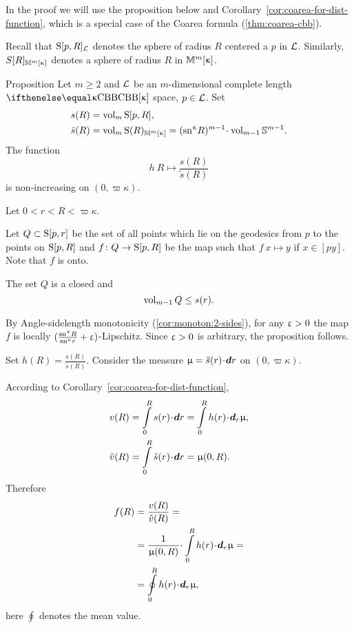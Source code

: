 In the proof we will use the proposition below and 
Corollary~\ref{cor:coarea-for-dist-function},
which is a special case of the Coarea formula (\ref{thm:coarea-cbb}).

Recall that $\mathrm{S}{}[p,R]_{\mathcal{L}}$ denotes the sphere of radius $R$ centered a $p$ in $\mathcal{L}$.
Similarly,  $S[R]_{\mathbb{M}_{{}}^{m}[{\upkappa}]}$ denotes  a sphere of radius $R$ in ${\mathbb{M}_{{}}^{m}[{\upkappa}]}$.

\begin{thm}{Proposition}\label{prop:monotonic-spheres}
Let $m\ge 2$ and 
$\mathcal{L}$ be an $m$-dimensional complete length $\Alex\kappa$ space, 
$p\in \spc{L}$.
Set
\begin{align*}
s(R)&=\vol_m\Sphere[p,R],
\\
\~s(R)&=\vol_m\Sphere(R)_{\Lob{m}{\kappa}}=(\sn\kappa R)^{m-1}\cdot\vol_{m-1}\SS^{m-1}.
\end{align*}
The function 
\[
h\: R\mapsto \frac {s(R)}{\tilde s(R)}
\]
is non-increasing on $(0,\varpi\kappa)$.
\end{thm}

Let $0<r<R<\varpi\kappa$.

Let $Q\subset \Sphere[p,r]$ be the set of all points 
which lie on the geodesics from $p$ to the points on $\mathrm{S}{}[p,R]$
and $f\:Q\to \Sphere[p,R]$ be the map such that $f\:x\mapsto y$ if $x\in [py]$.
Note that $f$ is onto.

The set $Q$ is a closed
and 
\[\vol_{m-1}Q\le s(r).\]

By Angle-sidelength  monotonicity (\ref{cor:monoton:2-sides}), 
for any $\upvarepsilon>0$ the map $f$ is 
locally $(\tfrac{\mathrm{sn}^{\upkappa} R}{\mathrm{sn}^{\upkappa} r}+\upvarepsilon)$-Lipschitz.
Since $\upvarepsilon>0$ is arbitrary, the proposition follows.
\qeds


Set $h(R)= \frac {s(R)}{\tilde s(R)}$.
Consider the measure $\mu=\tilde s(r)\cdot\d r$ on  $(0,\varpi\kappa)$.

According to Corollary~\ref{cor:coarea-for-dist-function},
\begin{align*}
v(R)&=\int\limits_0^R s(r)\cdot\d r=\int\limits_0^R h(r)\cdot\d_r \mu,
\\
\~v(R)&=\int\limits_0^R\tilde s(r)\cdot\d r=\mu(0,R).
\end{align*}
Therefore
\begin{align*}
f(R)&=\frac{v(R)}{\~v(R)}=
\\
&=\frac1{\mu(0,R)}\cdot\int\limits_0^R h(r)\cdot\d_r\mu=
\\
&=\oint\limits_0^R h(r)\cdot\d_r\mu,
\end{align*}
here $\oint$ denotes the mean value.

